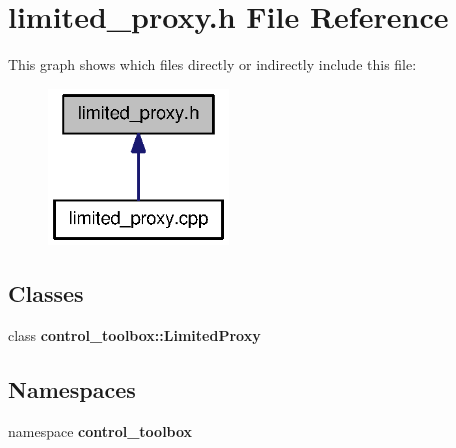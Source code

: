 \section{limited\-\_\-proxy.\-h \-File \-Reference}
\label{limited__proxy_8h}
\-This graph shows which files directly or indirectly include this file\-:
\nopagebreak
\begin{figure}[H]
\begin{center}
\leavevmode
\includegraphics[width=136pt]{limited__proxy_8h__dep__incl}
\end{center}
\end{figure}
\subsection*{\-Classes}
\begin{DoxyCompactItemize}
\item 
class {\bf control\-\_\-toolbox\-::\-Limited\-Proxy}
\end{DoxyCompactItemize}
\subsection*{\-Namespaces}
\begin{DoxyCompactItemize}
\item 
namespace {\bf control\-\_\-toolbox}
\end{DoxyCompactItemize}
